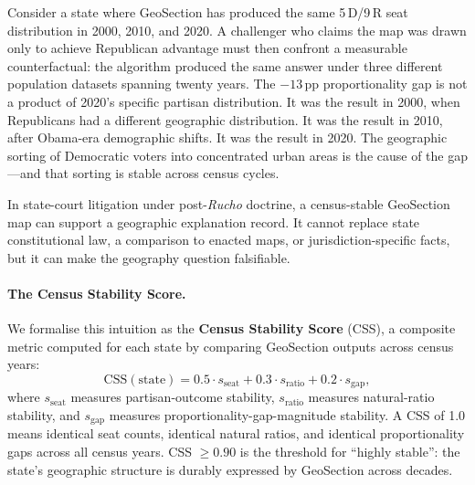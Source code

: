 Consider a state where GeoSection has produced the same 5\,D/9\,R seat
distribution in 2000, 2010, and 2020.
A challenger who claims the map was drawn only to achieve Republican advantage
must then confront a measurable counterfactual: the algorithm produced the same
answer under three different population datasets spanning twenty years.
The $-13$\,pp proportionality gap is not a product of 2020's specific partisan
distribution.
It was the result in 2000, when Republicans had a different geographic
distribution.
It was the result in 2010, after Obama-era demographic shifts.
It was the result in 2020.
The geographic sorting of Democratic voters into concentrated urban areas is
the cause of the gap---and that sorting is stable across census cycles.

In state-court litigation under post-\emph{Rucho} doctrine, a census-stable
GeoSection map can support a geographic explanation record.  It cannot replace
state constitutional law, a comparison to enacted maps, or jurisdiction-specific
facts, but it can make the geography question falsifiable.

\paragraph{The Census Stability Score.}
We formalise this intuition as the \textbf{Census Stability Score} (CSS), a
composite metric computed for each state by comparing GeoSection outputs across
census years:
\[
  \mathrm{CSS}(\text{state}) = 0.5 \cdot s_{\text{seat}}
                              + 0.3 \cdot s_{\text{ratio}}
                              + 0.2 \cdot s_{\text{gap}},
\]
where $s_{\text{seat}}$ measures partisan-outcome stability,
$s_{\text{ratio}}$ measures natural-ratio stability, and $s_{\text{gap}}$
measures proportionality-gap-magnitude stability.
A CSS of 1.0 means identical seat counts, identical natural ratios, and
identical proportionality gaps across all census years.
CSS $\geq 0.90$ is the threshold for ``highly stable'': the state's geographic
structure is durably expressed by GeoSection across decades.

